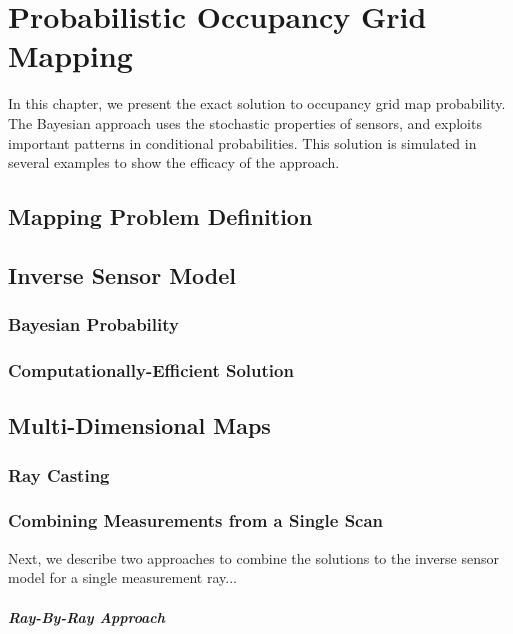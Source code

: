 
\chapter{Probabilistic Occupancy Grid Mapping} \label{chap:pogm}

In this chapter, we present the exact solution to occupancy grid map probability. The Bayesian approach uses the stochastic properties of sensors, and exploits important patterns in conditional probabilities. This solution is simulated in several examples to show the efficacy of the approach.

\section{Mapping Problem Definition}


\section{Inverse Sensor Model}

\subsection{Bayesian Probability}

\subsection{Computationally-Efficient Solution}

\section{Multi-Dimensional Maps}

\subsection{Ray Casting}

\subsection{Combining Measurements from a Single Scan}

Next, we describe two approaches to combine the solutions to the inverse sensor model for a single measurement ray...

\paragraph{Ray-By-Ray Approach}

